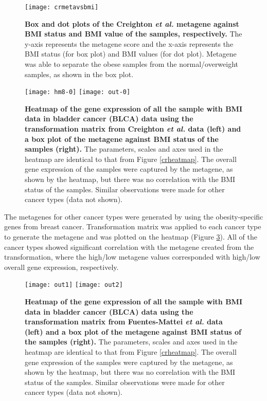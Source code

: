 \documentclass[12pt, a4paper]{article}
\begin{document}
\begin{figure}[h!]
\centering
\texttt{[image: crmetavsbmi]}
\caption{\textbf{Box and dot plots of the Creighton \textit{et al.} metagene against BMI status and BMI value of the samples, respectively.}
The y-axis represents the metagene score and the x-axis represents the BMI status (for box plot) and BMI values (for dot plot).
Metagene was able to separate the obese samples from the normal/overweight samples, as shown in the box plot.
}
\label{crmetavsbmi}
\end{figure}

\begin{figure}[h!]
\centering
\texttt{[image: hm8-0]}
\texttt{[image: out-0]}
\caption{\textbf{Heatmap of the gene expression of all the sample with BMI data in bladder cancer (BLCA) data using the transformation matrix from Creighton \textit{et al.} data  (left) and a box plot of the metagene against BMI status of the samples (right).}
The parameters, scales and axes used in the heatmap are identical to that from Figure \ref{crheatmap}.
The overall gene expression of the samples were captured by the metagene, as shown by the heatmap, but there was no correlation with the BMI status of the samples.
Similar observations were made for other cancer types (data not shown).
}
\label{blcameta}
\end{figure}

The metagenes for other cancer types were generated by using the obesity-specific genes from breast cancer.
Transformation matrix was applied to each cancer type to generate the metagene and was plotted on the heatmap (Figure \ref{blcameta}).
All of the cancer types showed significant correlation with the metagene created from the transformation, where the high/low metagene values corresponded with high/low overall gene expression, respectively.

\begin{figure}[h!]
\centering
\texttt{[image: out1]}
\texttt{[image: out2]}
\caption{\textbf{Heatmap of the gene expression of all the sample with BMI data in bladder cancer (BLCA) data using the transformation matrix from Fuentes-Mattei \textit{et al.} data  (left) and a box plot of the metagene against BMI status of the samples (right).}
The parameters, scales and axes used in the heatmap are identical to that from Figure \ref{crheatmap}.
The overall gene expression of the samples were captured by the metagene, as shown by the heatmap, but there was no correlation with the BMI status of the samples.
Similar observations were made for other cancer types (data not shown).
}
\label{blcameta}
\end{figure}
\end{document}
